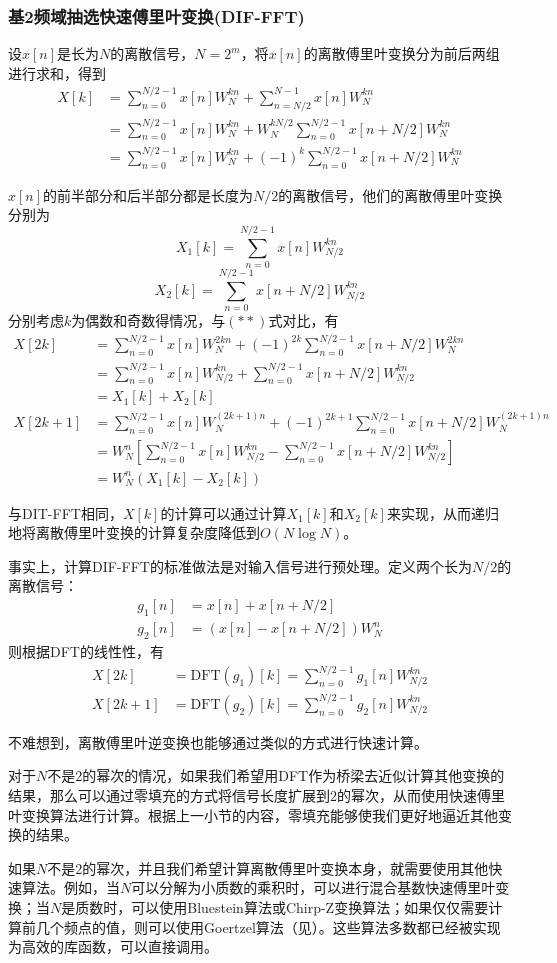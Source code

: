 \subsubsection{基2频域抽选快速傅里叶变换(DIF-FFT)}

设$x[n]$是长为$N$的离散信号，$N=2^m$，将$x[n]$的离散傅里叶变换分为前后两组进行求和，得到
\begin{align*}
X[k]&=\sum_{n=0}^{N/2-1}x[n]W_N^{kn}+\sum_{n=N/2}^{N-1}x[n]W_N^{kn}\\
&=\sum_{n=0}^{N/2-1}x[n]W_N^{kn}+W_N^{kN/2}\sum_{n=0}^{N/2-1}x[n+N/2]W_N^{kn}\\
&=\sum_{n=0}^{N/2-1}x[n]W_N^{kn}+(-1)^k\sum_{n=0}^{N/2-1}x[n+N/2]W_N^{kn}\tag{$**$}
\end{align*}

$x[n]$的前半部分和后半部分都是长度为$N/2$的离散信号，他们的离散傅里叶变换分别为$$X_1[k]=\sum_{n=0}^{N/2-1}x[n]W_{N/2}^{kn}$$
$$X_2[k]=\sum_{n=0}^{N/2-1}x[n+N/2]W_{N/2}^{kn}$$
分别考虑$k$为偶数和奇数得情况，与$(**)$式对比，有
\begin{align*}
X[2k]&=\sum_{n=0}^{N/2-1}x[n]W_N^{2kn}+(-1)^{2k}\sum_{n=0}^{N/2-1}x[n+N/2]W_N^{2kn}\\
&=\sum_{n=0}^{N/2-1}x[n]W_{N/2}^{kn}+\sum_{n=0}^{N/2-1}x[n+N/2]W_{N/2}^{kn}\\
&=X_1[k]+X_2[k]\\
X[2k+1]&=\sum_{n=0}^{N/2-1}x[n]W_N^{(2k+1)n}+(-1)^{2k+1}\sum_{n=0}^{N/2-1}x[n+N/2]W_N^{(2k+1)n}\\
&=W_{N}^n\left[\sum_{n=0}^{N/2-1}x[n]W_{N/2}^{kn}-\sum_{n=0}^{N/2-1}x[n+N/2]W_{N/2}^{kn}\right]\\
&=W_N^n(X_1[k]-X_2[k])
\end{align*}

与DIT-FFT相同，$X[k]$的计算可以通过计算$X_1[k]$和$X_2[k]$来实现，从而递归地将离散傅里叶变换的计算复杂度降低到$O(N\log N)$。

事实上，计算DIF-FFT的标准做法是对输入信号进行预处理。定义两个长为$N/2$的离散信号：
\begin{align*}
    g_1[n]&=x[n]+x[n+N/2]\\
    g_2[n]&=(x[n]-x[n+N/2])W_N^n
\end{align*}
则根据DFT的线性性，有
\begin{align*}
    X[2k]&=\mathrm{DFT}(g_1)[k]=\sum_{n=0}^{N/2-1}g_1[n]W_{N/2}^{kn}\\
    X[2k+1]&=\mathrm{DFT}(g_2)[k]=\sum_{n=0}^{N/2-1}g_2[n]W_{N/2}^{kn}
\end{align*}

不难想到，离散傅里叶逆变换也能够通过类似的方式进行快速计算。

对于$N$不是$2$的幂次的情况，如果我们希望用DFT作为桥梁去近似计算其他变换的结果，那么可以通过零填充的方式将信号长度扩展到$2$的幂次，从而使用快速傅里叶变换算法进行计算。根据上一小节的内容，零填充能够使我们更好地逼近其他变换的结果。

如果$N$不是$2$的幂次，并且我们希望计算离散傅里叶变换本身，就需要使用其他快速算法。例如，当$N$可以分解为小质数的乘积时，可以进行混合基数快速傅里叶变换；当$N$是质数时，可以使用Bluestein算法或Chirp-Z变换算法；如果仅仅需要计算前几个频点的值，则可以使用Goertzel算法（见\cite{dsp}）。这些算法多数都已经被实现为高效的库函数，可以直接调用。